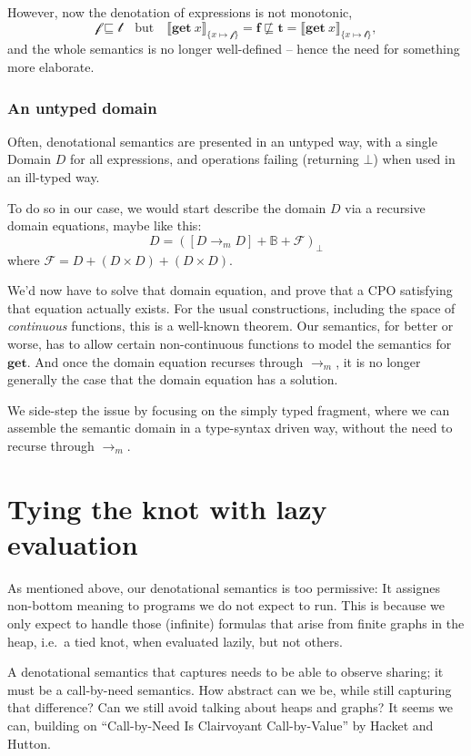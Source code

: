 \documentclass[manuscript,screen,acmsmall,nonacm]{acmart}
\newcommand{\syntax}[1]{\mathbf{#1}}
\newcommand{\sGet}{\syntax{get}}
\newcommand{\dBool}{\mathbb B}
\newcommand{\dFalse}{\mathbf{f}}
\newcommand{\dTrue}{\mathbf{t}}
\newcommand{\rTrue}{\mathscr{t}}
\newcommand{\rFalse}{\mathscr{f}}
\newcommand{\dRBool}{\mathcal F}
\newcommand{\D}[1]{\llbracket #1 \rrbracket}
\begin{document}
However, now the denotation of expressions is not monotonic,
\[
\rFalse \sqsubseteq \rTrue
\quad\text{but}\quad
\D{\sGet~x}_{\{x \mapsto \rFalse\}} = \dFalse
\not\sqsubseteq
\dTrue = \D{\sGet~x}_{\{x \mapsto \rTrue\}},
\]
and the whole semantics is no longer well-defined -- hence the need for something more elaborate.

\subsubsection{An untyped domain}

Often, denotational semantics are presented in an untyped way, with a single Domain $D$ for all expressions, and operations failing (returning $\bot$) when used in an ill-typed way.

To do so in our case, we would start describe the domain $D$ via a recursive domain equations, maybe like this:
\[
D = ([D \to_m D] + \dBool + \dRBool)_\bot
\]
where $\dRBool = D + (D \times D) + (D \times D)$.

We'd now have to solve that domain equation, and prove that a CPO satisfying that equation actually exists. For the usual constructions, including the space of \emph{continuous} functions, this is a well-known theorem. Our semantics, for better or worse, has to allow certain non-continuous functions to model the semantics for $\sGet$. And once the domain equation recurses through $\to_m$, it is no longer generally the case that the domain equation has a solution.

We side-step the issue by focusing on the simply typed fragment, where we can assemble the semantic domain in a type-syntax driven way, without the need to recurse through $\to_m$.

\section{Tying the knot with lazy evaluation}\label{sec:call-by-need}

As mentioned above, our denotational semantics is too permissive: It assignes non-bottom meaning to programs we do not expect to run. This is because we only expect to handle those (infinite) formulas that arise from finite graphs in the heap, i.e.\ a tied knot, when evaluated lazily, but not others.

A denotational semantics that captures needs to be able to observe sharing; it must be a call-by-need semantics. How abstract can we be, while still capturing that difference? Can we still avoid talking about heaps and graphs? It seems we can, building on “Call-by-Need Is Clairvoyant Call-by-Value” by Hacket and Hutton.
\end{document}
